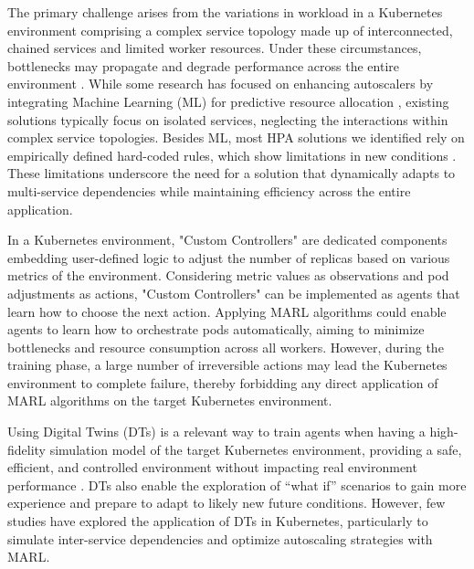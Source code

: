 \documentclass[conference]{IEEEtran}
\begin{document}
The primary challenge arises from the variations in workload in a Kubernetes environment comprising a complex service topology made up of interconnected, chained services and limited worker resources. Under these circumstances, bottlenecks may propagate and degrade performance across the entire environment \cite{park_predictive_scaling}. While some research has focused on enhancing autoscalers by integrating Machine Learning (ML) for predictive resource allocation \cite{liu_dt_cloud}, existing solutions typically focus on isolated services, neglecting the interactions within complex service topologies. Besides ML, most HPA solutions we identified rely on empirically defined hard-coded rules, which show limitations in new conditions \cite{keda}. These limitations underscore the need for a solution that dynamically adapts to multi-service dependencies while maintaining efficiency across the entire application.

In a Kubernetes environment, "Custom Controllers" are dedicated components embedding user-defined logic to adjust the number of replicas based on various metrics of the environment. Considering metric values as observations and pod adjustments as actions, "Custom Controllers" can be implemented as agents that learn how to choose the next action. Applying MARL algorithms could enable agents to learn how to orchestrate pods automatically, aiming to minimize bottlenecks and resource consumption across all workers. However, during the training phase, a large number of irreversible actions may lead the Kubernetes environment to complete failure, thereby forbidding any direct application of MARL algorithms on the target Kubernetes environment.

Using Digital Twins (DTs) is a relevant way to train agents when having a high-fidelity simulation model of the target Kubernetes environment, providing a safe, efficient, and controlled environment without impacting real environment performance \cite{nguyen_sim2reality,schleich_digital_twin}. DTs also enable the exploration of “what if” scenarios to gain more experience and prepare to adapt to likely new future conditions. However, few studies have explored the application of DTs in Kubernetes, particularly to simulate inter-service dependencies and optimize autoscaling strategies with MARL.
\end{document}
